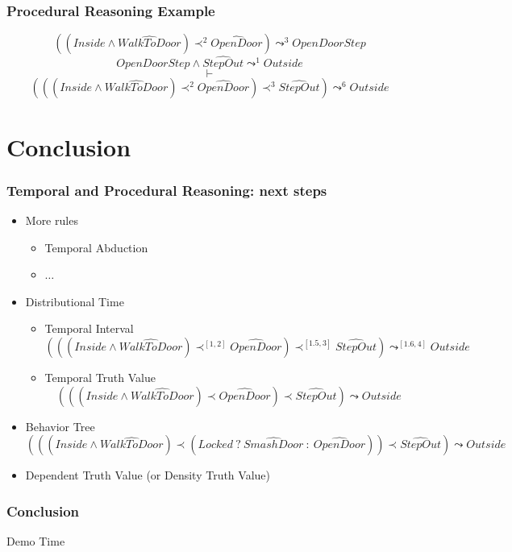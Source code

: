 \documentclass[aspectratio=169]{beamer}
\begin{document}
\begin{frame}
  \frametitle{Procedural Reasoning Example}
  $$\left( \left( Inside \wedge \widehat{WalkToDoor}\right)
  \prec^{2} \widehat{OpenDoor}\right) \leadsto^{3} OpenDoorStep$$
  $$OpenDoorStep \wedge \widehat{StepOut} \leadsto^{1} Outside$$
  $$\vdash$$
  $$\left( \left( \left( Inside \wedge \widehat{WalkToDoor}\right)
  \prec^{2} \widehat{OpenDoor}\right) \prec^{3} \widehat{StepOut}\right) \leadsto^{6} Outside$$
\end{frame}

\section{Conclusion}

\begin{frame}
  \frametitle{Temporal and Procedural Reasoning: next steps}
  \begin{itemize}
  \item<+-> More rules
    \begin{itemize}
    \item Temporal Abduction
    \item $\dots$
    \end{itemize}
  \item<+-> Distributional Time
    \begin{itemize}
    \item Temporal Interval
      $$(((Inside \wedge \widehat{WalkToDoor}) \prec^{[1,2]}
    \widehat{OpenDoor}) \prec^{[1.5,3]} \widehat{StepOut}) \leadsto^{[1.6,4]}
    Outside$$
  \item Temporal Truth Value
      $$(((Inside \wedge \widehat{WalkToDoor}) \prec
    \widehat{OpenDoor}) \prec \widehat{StepOut}) \leadsto Outside$$
    \end{itemize}
  \item<+-> Behavior Tree
    {\small
      $$(((Inside \wedge \widehat{WalkToDoor}) \prec
    (Locked\ ?\ \widehat{SmashDoor}\ :\ \widehat{OpenDoor})) \prec \widehat{StepOut}) \leadsto Outside$$}
  \item<+-> Dependent Truth Value (or Density Truth Value)
  \end{itemize}
\end{frame}

\begin{frame}
  \frametitle{Conclusion}
  \begin{center} Demo Time \end{center}
\end{frame}
\end{document}
